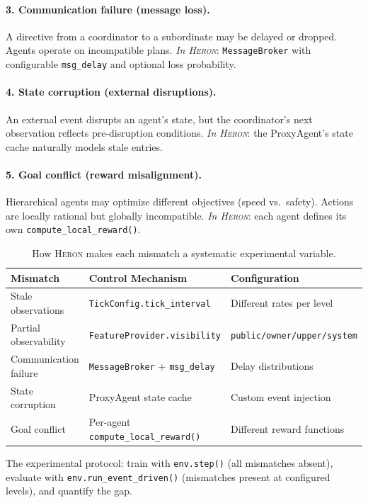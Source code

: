 \documentclass{article}
\newcommand{\heron}{\textsc{Heron}}
\begin{document}
\paragraph{3. Communication failure (message loss).}
A directive from a coordinator to a subordinate may be delayed or dropped. Agents operate on incompatible plans. \emph{In \heron{}}: \texttt{MessageBroker} with configurable \texttt{msg\_delay} and optional loss probability.

\paragraph{4. State corruption (external disruptions).}
An external event disrupts an agent's state, but the coordinator's next observation reflects pre-disruption conditions. \emph{In \heron{}}: the ProxyAgent's state cache naturally models stale entries.

\paragraph{5. Goal conflict (reward misalignment).}
Hierarchical agents may optimize different objectives (speed vs.\ safety). Actions are locally rational but globally incompatible. \emph{In \heron{}}: each agent defines its own \texttt{compute\_local\_reward()}.

\begin{table}[t]
\centering
\caption{How \heron{} makes each mismatch a systematic experimental variable.}
\label{tab:mismatches}
\small
\begin{tabular}{@{}lll@{}}
\toprule
\textbf{Mismatch} & \textbf{Control Mechanism} & \textbf{Configuration} \\
\midrule
Stale observations & \texttt{TickConfig.tick\_interval} & Different rates per level \\
Partial observability & \texttt{FeatureProvider.visibility} & \texttt{public/owner/upper/system} \\
Communication failure & \texttt{MessageBroker} + \texttt{msg\_delay} & Delay distributions \\
State corruption & ProxyAgent state cache & Custom event injection \\
Goal conflict & Per-agent \texttt{compute\_local\_reward()} & Different reward functions \\
\bottomrule
\end{tabular}
\end{table}

The experimental protocol: train with \texttt{env.step()} (all mismatches absent), evaluate with \texttt{env.run\_event\_driven()} (mismatches present at configured levels), and quantify the gap.
\end{document}
